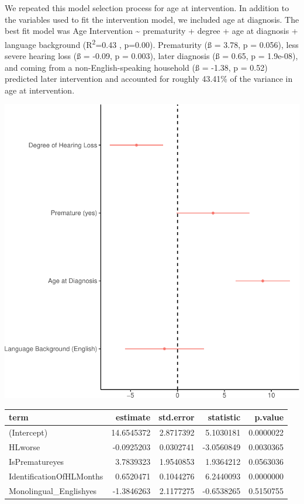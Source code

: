 \documentclass[english,man]{apa6}
\begin{document}
We repeated this model selection process for age at intervention. In addition to the variables used to fit the intervention model, we included age at diagnosis. The best fit model was Age Intervention \textasciitilde{} prematurity + degree + age at diagnosis + language background (R\textsuperscript{2}=0.43 , p=0.00). Prematurity (ß = 3.78, p = 0.056), less severe hearing loss (ß = -0.09, p = 0.003), later diagnosis (ß = 0.65, p = 1.9e-08), and coming from a non-English-speaking household (ß = -1.38, p = 0.52) predicted later intervention and accounted for roughly 43.41\% of the variance in age at intervention.

\includegraphics{ELSSP_paper_files/figure-latex/intervention-betas-1.pdf}

\begin{table}[H]
\centering
\begin{tabular}{l|r|r|r|r}
\hline
term & estimate & std.error & statistic & p.value\\
\hline
(Intercept) & 14.6545372 & 2.8717392 & 5.1030181 & 0.0000022\\
\hline
HLworse & -0.0925203 & 0.0302741 & -3.0560849 & 0.0030365\\
\hline
IsPrematureyes & 3.7839323 & 1.9540853 & 1.9364212 & 0.0563036\\
\hline
IdentificationOfHLMonths & 0.6520471 & 0.1044276 & 6.2440093 & 0.0000000\\
\hline
Monolingual\_Englishyes & -1.3846263 & 2.1177275 & -0.6538265 & 0.5150755\\
\hline
\end{tabular}
\end{table}
\end{document}
